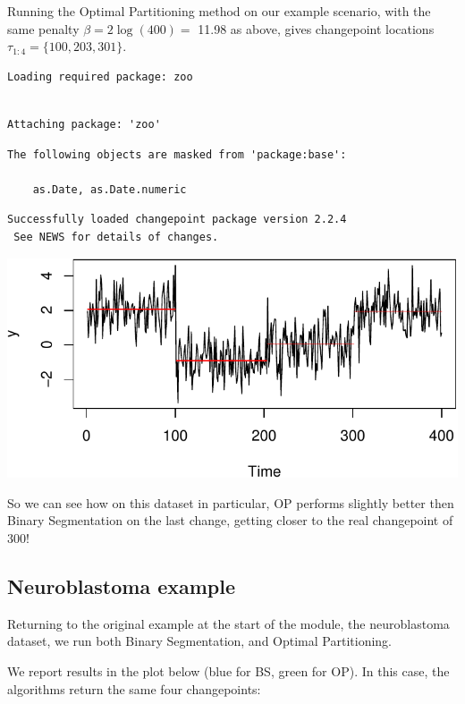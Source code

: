 \documentclass[
  letterpaper,
  DIV=11,
  numbers=noendperiod]{scrreprt}
\begin{document}
Running the Optimal Partitioning method on our example scenario, with
the same penalty \(\beta = 2 \log(400) =\) 11.98 as above, gives
changepoint locations \(\tau_{1:4} = \{100, 203, 301\}\).

\begin{verbatim}
Loading required package: zoo
\end{verbatim}

\begin{verbatim}

Attaching package: 'zoo'
\end{verbatim}

\begin{verbatim}
The following objects are masked from 'package:base':

    as.Date, as.Date.numeric
\end{verbatim}

\begin{verbatim}
Successfully loaded changepoint package version 2.2.4
 See NEWS for details of changes.
\end{verbatim}

\includegraphics{3_multiple_changes_files/figure-pdf/unnamed-chunk-16-1.pdf}

So we can see how on this dataset in particular, OP performs slightly
better then Binary Segmentation on the last change, getting closer to
the real changepoint of 300!

\subsection{Neuroblastoma example}\label{neuroblastoma-example}

Returning to the original example at the start of the module, the
neuroblastoma dataset, we run both Binary Segmentation, and Optimal
Partitioning.

We report results in the plot below (blue for BS, green for OP). In this
case, the algorithms return the same four changepoints:
\end{document}

